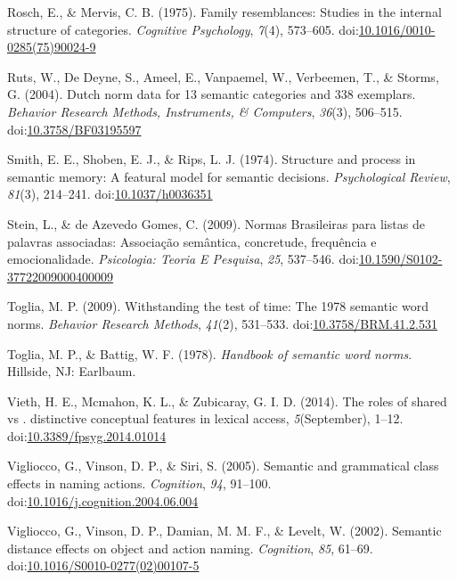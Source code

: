 \documentclass[english,,man]{apa6}
\theoremstyle{definition}
\theoremstyle{definition}
\theoremstyle{definition}
\theoremstyle{remark}
\begin{document}
\hypertarget{ref-Rosch1975}{}
Rosch, E., \& Mervis, C. B. (1975). Family resemblances: Studies in the
internal structure of categories. \emph{Cognitive Psychology},
\emph{7}(4), 573--605.
doi:\href{https://doi.org/10.1016/0010-0285(75)90024-9}{10.1016/0010-0285(75)90024-9}

\hypertarget{ref-Ruts2004}{}
Ruts, W., De Deyne, S., Ameel, E., Vanpaemel, W., Verbeemen, T., \&
Storms, G. (2004). Dutch norm data for 13 semantic categories and 338
exemplars. \emph{Behavior Research Methods, Instruments, \& Computers},
\emph{36}(3), 506--515.
doi:\href{https://doi.org/10.3758/BF03195597}{10.3758/BF03195597}

\hypertarget{ref-Smith1974}{}
Smith, E. E., Shoben, E. J., \& Rips, L. J. (1974). Structure and
process in semantic memory: A featural model for semantic decisions.
\emph{Psychological Review}, \emph{81}(3), 214--241.
doi:\href{https://doi.org/10.1037/h0036351}{10.1037/h0036351}

\hypertarget{ref-Stein2009}{}
Stein, L., \& de Azevedo Gomes, C. (2009). Normas Brasileiras para
listas de palavras associadas: Associação semântica, concretude,
frequência e emocionalidade. \emph{Psicologia: Teoria E Pesquisa},
\emph{25}, 537--546.
doi:\href{https://doi.org/10.1590/S0102-37722009000400009}{10.1590/S0102-37722009000400009}

\hypertarget{ref-Toglia2009}{}
Toglia, M. P. (2009). Withstanding the test of time: The 1978 semantic
word norms. \emph{Behavior Research Methods}, \emph{41}(2), 531--533.
doi:\href{https://doi.org/10.3758/BRM.41.2.531}{10.3758/BRM.41.2.531}

\hypertarget{ref-Toglia1978}{}
Toglia, M. P., \& Battig, W. F. (1978). \emph{Handbook of semantic word
norms}. Hillside, NJ: Earlbaum.

\hypertarget{ref-Vieth2014}{}
Vieth, H. E., Mcmahon, K. L., \& Zubicaray, G. I. D. (2014). The roles
of shared vs . distinctive conceptual features in lexical access,
\emph{5}(September), 1--12.
doi:\href{https://doi.org/10.3389/fpsyg.2014.01014}{10.3389/fpsyg.2014.01014}

\hypertarget{ref-Vigliocco2005}{}
Vigliocco, G., Vinson, D. P., \& Siri, S. (2005). Semantic and
grammatical class effects in naming actions. \emph{Cognition},
\emph{94}, 91--100.
doi:\href{https://doi.org/10.1016/j.cognition.2004.06.004}{10.1016/j.cognition.2004.06.004}

\hypertarget{ref-Vigliocco2002}{}
Vigliocco, G., Vinson, D. P., Damian, M. M. F., \& Levelt, W. (2002).
Semantic distance effects on object and action naming. \emph{Cognition},
\emph{85}, 61--69.
doi:\href{https://doi.org/10.1016/S0010-0277(02)00107-5}{10.1016/S0010-0277(02)00107-5}
\end{document}
